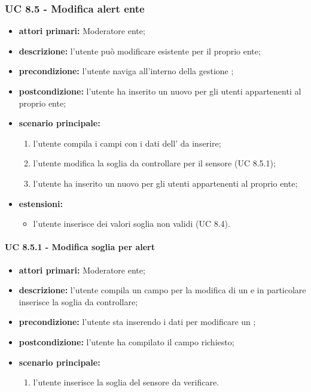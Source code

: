 			\subsubsection{UC 8.5 - Modifica alert ente}
			\begin{itemize}
				\item \textbf{attori primari:} Moderatore ente;
				\item \textbf{descrizione:} l'utente può modificare  esistente per il proprio ente;
				\item \textbf{precondizione:} l'utente naviga all'interno della gestione ;
				\item \textbf{postcondizione:} l'utente ha inserito un nuovo  per gli utenti appartenenti al proprio ente;
				\item \textbf{scenario principale:}
				\begin{enumerate}
					\item{l'utente compila i campi con i dati dell' da inserire;}
					\item l'utente modifica la soglia da controllare per il sensore (UC 8.5.1);
					\item{l'utente ha inserito un nuovo  per gli utenti appartenenti al proprio ente;}
				\end{enumerate}
				\item \textbf{estensioni:}
				\begin{itemize}
					\item l'utente inserisce dei valori soglia non validi (UC 8.4).
				\end{itemize}		
			\end{itemize}

				\paragraph{UC 8.5.1 - Modifica soglia per alert}
				\begin{itemize}
					\item \textbf{attori primari:} Moderatore ente;
					\item \textbf{descrizione:} l'utente compila un campo per la modifica di un  e in particolare inserisce la soglia da controllare;
					\item \textbf{precondizione:} l'utente sta inserendo i dati per modificare un ;
					\item \textbf{postcondizione:} l'utente ha compilato il campo richiesto;
					\item \textbf{scenario principale:}
					\begin{enumerate}
						\item{l'utente inserisce la soglia del sensore da verificare.}
					\end{enumerate}	
				\end{itemize}